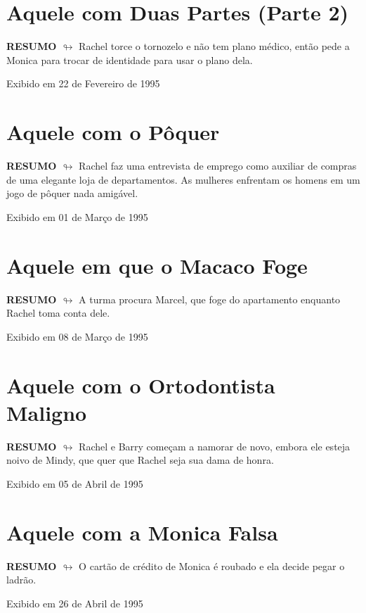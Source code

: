 \chapter{Aquele com Duas Partes (Parte 2)}

\textbf{RESUMO $\looparrowright$} Rachel torce o tornozelo e não tem plano médico, então pede a Monica para trocar de identidade para usar o plano dela.

\begin{flushright}
\textcolor{gray600}{Exibido em 22 de Fevereiro de 1995}
\end{flushright}


\chapter{Aquele com o Pôquer}

\textbf{RESUMO $\looparrowright$} Rachel faz uma entrevista de emprego como auxiliar de compras de uma elegante loja de departamentos. As mulheres enfrentam os homens em um jogo de pôquer nada amigável.

\begin{flushright}
\textcolor{gray600}{Exibido em 01 de Março de 1995}
\end{flushright}


\chapter{Aquele em que o Macaco Foge}

\textbf{RESUMO $\looparrowright$} A turma procura Marcel, que foge do apartamento enquanto Rachel toma conta dele.

\begin{flushright}
\textcolor{gray600}{Exibido em 08 de Março de 1995}
\end{flushright}


\chapter{Aquele com o Ortodontista Maligno}

\textbf{RESUMO $\looparrowright$} Rachel e Barry começam a namorar de novo, embora ele esteja noivo de Mindy, que quer que Rachel seja sua dama de honra.

\begin{flushright}
\textcolor{gray600}{Exibido em 05 de Abril de 1995}
\end{flushright}


\chapter{Aquele com a Monica Falsa}

\textbf{RESUMO $\looparrowright$} O cartão de crédito de Monica é roubado e ela decide pegar o ladrão.

\begin{flushright}
\textcolor{gray600}{Exibido em 26 de Abril de 1995}
\end{flushright}


